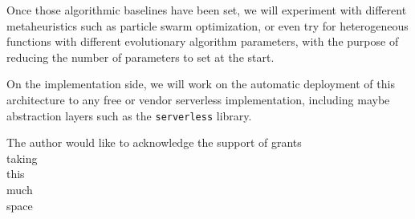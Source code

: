 \documentclass[sigconf]{acmart}
\begin{document}
Once those algorithmic baselines have been set, we will experiment
with different metaheuristics such as particle swarm optimization, or
even try for heterogeneous functions with different evolutionary
algorithm parameters, with the purpose of reducing the number of
parameters to set at the start.

On the implementation side, we will work on the automatic deployment
of this architecture to any free or vendor serverless implementation,
including maybe abstraction layers such as the {\tt serverless}
library. 




\begin{acks}

  The author would like to acknowledge the support of grants\\
  taking\\
  this\\
  much\\
  space\\

\end{acks}




\end{document}
